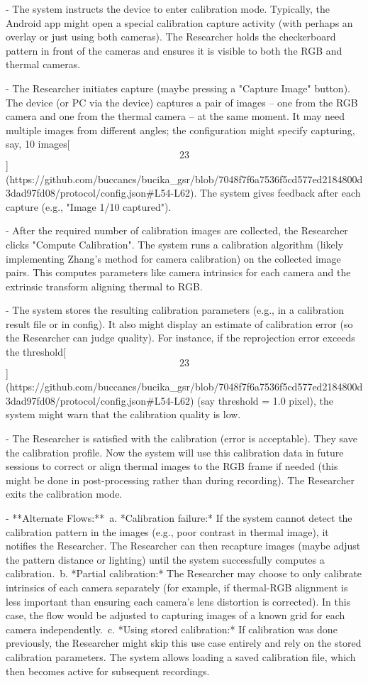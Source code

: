 \documentclass[12pt,a4paper]{article}
\begin{document}
- The system instructs the device to enter calibration mode. Typically,
  the Android app might open a special calibration capture activity
  (with perhaps an overlay or just using both cameras). The Researcher
  holds the checkerboard pattern in front of the cameras and ensures it
  is visible to both the RGB and thermal cameras.

- The Researcher initiates capture (maybe pressing a "Capture Image"
  button). The device (or PC via the device) captures a pair of images
  -- one from the RGB camera and one from the thermal camera -- at the
  same moment. It may need multiple images from different angles; the
  configuration might specify capturing, say, 10
  images[\[23\]](https://github.com/buccancs/bucika_gsr/blob/7048f7f6a7536f5cd577ed2184800d3dad97fd08/protocol/config.json#L54-L62).
  The system gives feedback after each capture (e.g., "Image 1/10
  captured").

- After the required number of calibration images are collected, the
  Researcher clicks "Compute Calibration". The system runs a calibration
  algorithm (likely implementing Zhang's method for camera calibration)
  on the collected image pairs. This computes parameters like camera
  intrinsics for each camera and the extrinsic transform aligning
  thermal to RGB.

- The system stores the resulting calibration parameters (e.g., in a
  calibration result file or in config). It also might display an
  estimate of calibration error (so the Researcher can judge quality).
  For instance, if the reprojection error exceeds the
  threshold[\[23\]](https://github.com/buccancs/bucika_gsr/blob/7048f7f6a7536f5cd577ed2184800d3dad97fd08/protocol/config.json#L54-L62)
  (say threshold = 1.0 pixel), the system might warn that the
  calibration quality is low.

- The Researcher is satisfied with the calibration (error is
  acceptable). They save the calibration profile. Now the system will
  use this calibration data in future sessions to correct or align
  thermal images to the RGB frame if needed (this might be done in
  post-processing rather than during recording). The Researcher exits
  the calibration mode.

- **Alternate Flows:**\
  a. *Calibration failure:* If the system cannot detect the calibration
  pattern in the images (e.g., poor contrast in thermal image), it
  notifies the Researcher. The Researcher can then recapture images
  (maybe adjust the pattern distance or lighting) until the system
  successfully computes a calibration.\
  b. *Partial calibration:* The Researcher may choose to only calibrate
  intrinsics of each camera separately (for example, if thermal-RGB
  alignment is less important than ensuring each camera's lens
  distortion is corrected). In this case, the flow would be adjusted to
  capturing images of a known grid for each camera independently.\
  c. *Using stored calibration:* If calibration was done previously, the
  Researcher might skip this use case entirely and rely on the stored
  calibration parameters. The system allows loading a saved calibration
  file, which then becomes active for subsequent recordings.
\end{document}
